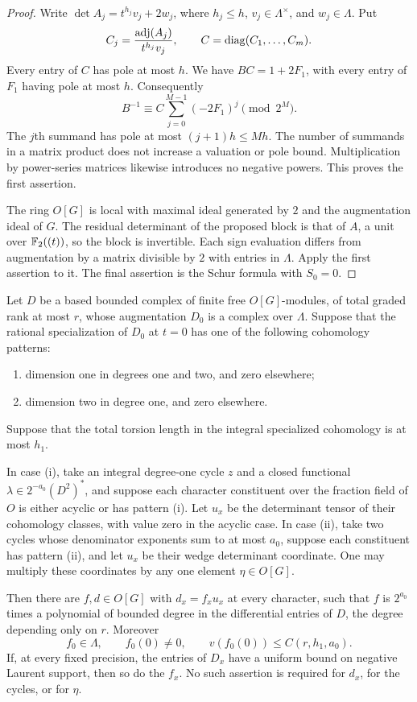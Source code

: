 \begin{proof}
Write
$\det A_j=t^{h_j}v_j+2w_j$, where $h_j\le h$,
$v_j\in\Lambda^\times$, and $w_j\in\Lambda$. Put
\[
 C_j=\frac{\operatorname{adj}(A_j)}{t^{h_j}v_j},
 \qquad C=\operatorname{diag}(C_1,\ldots,C_m).
\]
Every entry of $C$ has pole at most $h$. We have $BC=1+2F_1$, with
every entry of $F_1$ having pole at most $h$. Consequently
\[
 B^{-1}\equiv C\sum_{j=0}^{M-1}(-2F_1)^j\pmod{2^M}.
\]
The $j$th summand has pole at most $(j+1)h\le Mh$. The number of
summands in a matrix product does not increase a valuation or pole
bound. Multiplication by power-series matrices likewise introduces no
negative powers. This proves the first assertion.

The ring $O[G]$ is local with maximal ideal generated by $2$ and the
augmentation ideal of $G$. The residual determinant of the proposed
block is that of $A$, a unit over $\mathbb F_2((t))$, so the block is
invertible. Each sign evaluation differs from augmentation by a
matrix divisible by $2$ with entries in $\Lambda$. Apply the first
assertion to it. The final assertion is the Schur formula with
$S_0=0$.
\end{proof}

\begin{lemma}\label{lem:h:pivot-clearing}
Let $D$ be a based bounded complex of finite free $O[G]$-modules, of
total graded rank at most $r$, whose augmentation $D_0$ is a complex
over $\Lambda$. Suppose that the rational specialization of $D_0$ at
$t=0$ has one of the following cohomology patterns:
\begin{enumerate}[label=\textup{(\roman*)}]
 \item dimension one in degrees one and two, and zero elsewhere;
 \item dimension two in degree one, and zero elsewhere.
\end{enumerate}
Suppose that the total torsion length in the integral specialized
cohomology is at most $h_1$.

In case \textup{(i)}, take an integral degree-one cycle $z$ and a closed
functional $\lambda\in2^{-a_0}(D^2)^*$, and suppose each character
constituent over the fraction field of $O$ is either acyclic or has
pattern \textup{(i)}. Let $u_x$ be the determinant tensor of their
cohomology classes, with value zero in the acyclic case. In case
\textup{(ii)}, take two cycles whose denominator exponents sum to at
most $a_0$, suppose each constituent has pattern \textup{(ii)}, and
let $u_x$ be their wedge determinant coordinate. One may multiply these
coordinates by any one element $\eta\in O[G]$.

Then there are $f,d\in O[G]$ with $d_x=f_xu_x$ at every character,
such that $f$ is $2^{a_0}$ times a polynomial of bounded degree in
the differential entries of $D$, the degree depending only on $r$.
Moreover
\[
 f_0\in\Lambda,\qquad f_0(0)\ne0,\qquad
 v(f_0(0))\le C(r,h_1,a_0).
\]
If, at every fixed precision, the entries of $D_x$ have a uniform bound
on negative Laurent support, then so do the $f_x$. No such assertion is
required for $d_x$, for the cycles, or for $\eta$.
\end{lemma}

